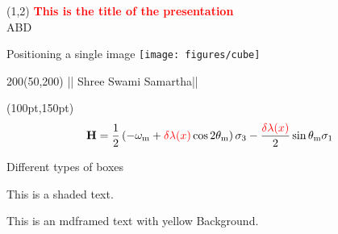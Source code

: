 \documentclass{beamer}
\begin{document}
{ 
\begin{frame}
 \begin{textblock}{10.0}(1,2)
  \textcolor{red}{\textbf{This is the title of the presentation}}\\
  ABD
  
 \end{textblock}
\end{frame}}



\begin{frame}{Positioning a single image}
 \texttt{[image: figures/cube]}
 \setlength{\TPHorizModule}{\textwidth}
 \setlength{\TPVertModule}{\textwidth}
 \begin{textblock*}{200}(50,200)
  || Shree Swami Samartha||
 \end{textblock*}
 \begin{textblock*}{10pt}(100pt,150pt)
\small
\begin{equation*}
    \mathbf {H} = \frac{1}{2}\left( - \omega_{\mathrm{m}} + {\color{red}\delta \lambda(x)} \cos 2\theta_{\mathrm{m}} \right) \sigma_3 - \frac{  {\color{red}\delta \lambda(x)}  }{2} \sin \theta_{\mathrm{m}} \sigma_1
\end{equation*}
\end{textblock*}

\end{frame}


\begin{frame}{Different types of boxes}


\begin{shaded}
 This is a shaded text.
\end{shaded}




\begin{mdframed}[backgroundcolor = yellow]
This is an mdframed text with yellow Background. 
\end{mdframed}

\end{frame}
\end{document}
